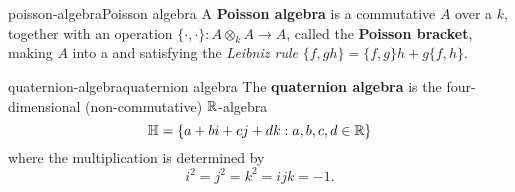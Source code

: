 \begin{topic}{poisson-algebra}{Poisson algebra}
    A \textbf{Poisson algebra} is a commutative  $A$ over a  $k$, together with an operation $\{ \cdot, \cdot \} : A \otimes_k A \to A$, called the \textbf{Poisson bracket}, making $A$ into a  and satisfying the \textit{Leibniz rule} $\{ f, gh \} = \{ f, g \} h + g \{ f, h \}$. %
\end{topic}

\begin{topic}{quaternion-algebra}{quaternion algebra}
    The \textbf{quaternion algebra} is the four-dimensional (non-commutative) $\mathbb{R}$-algebra
    \[ \mathbb{H} = \{ a + bi + cj + dk : a, b, c, d \in \mathbb{R} \} \]
    where the multiplication is determined by
    \[ i^2 = j^2 = k^2 = ijk = -1 . \]
\end{topic}


